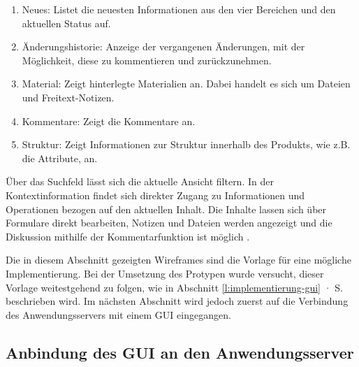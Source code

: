 \begin{enumerate}\itemsep -5pt
\item Neues: Listet die neuesten Informationen aus den vier Bereichen und den aktuellen Status auf.
\item Änderungshistorie: Anzeige der vergangenen Änderungen, mit der Möglichkeit, diese zu kommentieren und zurückzunehmen.
\item Material: Zeigt hinterlegte Materialien an. Dabei handelt es sich um Dateien und Freitext-Notizen.
\item Kommentare: Zeigt die Kommentare an.
\item Struktur: Zeigt Informationen zur Struktur innerhalb des Produkts, wie z.B. die Attribute, an.
\end{enumerate}

Über das Suchfeld  lässt sich die aktuelle Ansicht filtern. In der Kontextinformation findet sich direkter Zugang zu Informationen und Operationen bezogen auf den aktuellen Inhalt. Die Inhalte lassen sich über Formulare  direkt bearbeiten, Notizen und Dateien werden angezeigt  und die Diskussion mithilfe der Kommentarfunktion ist möglich .

\pagebreak

\secbar

Die in diesem Abschnitt gezeigten Wireframes sind die Vorlage für eine mögliche Implementierung. Bei der Umsetzung des Protypen wurde versucht, dieser Vorlage weitestgehend zu folgen, wie in Abschnitt \ref{l:implementierung-gui} · S.\pageref{l:implementierung-gui} beschrieben wird. Im nächsten Abschnitt wird jedoch zuerst auf die Verbindung des Anwendungsservers mit einem GUI eingegangen.

\pagebreak

\subsection{Anbindung des GUI an den Anwendungsserver}\label{l:anbindung-gui}

